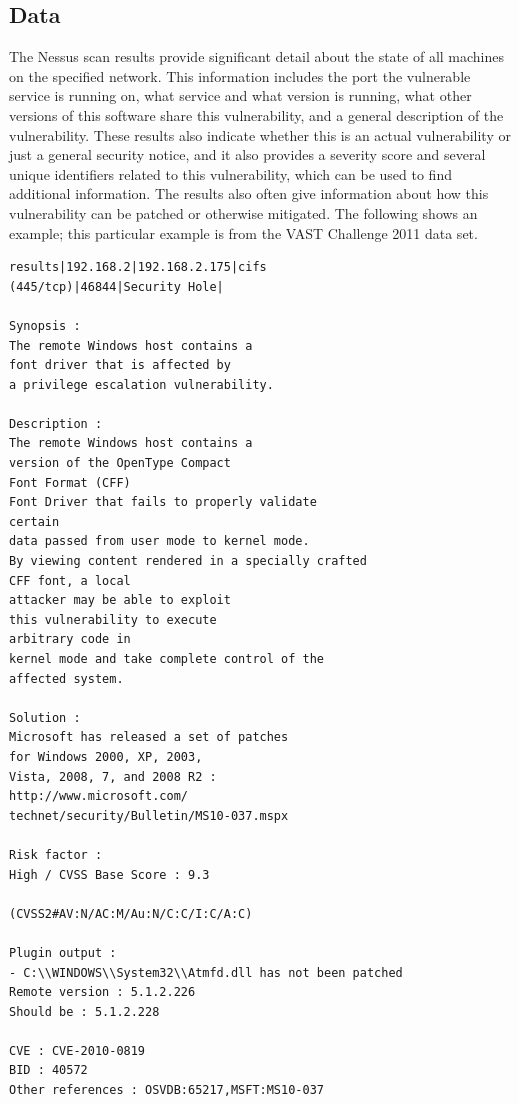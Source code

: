 \documentclass{acm_proc_article-sp}
\begin{document}
\subsection{Data}
The Nessus scan results provide significant detail about the state of all machines on the specified network.
This information includes the port the vulnerable service is running on, what service and what version is running, what other versions of this software share this vulnerability, and a general description of the vulnerability.
These results also indicate whether this is an actual vulnerability or just a general security notice, and it also provides a severity score and several unique identifiers related to this vulnerability, which can be used to find additional information.
The results also often give information about how this vulnerability can be patched or otherwise mitigated. The following shows an example; this particular example is from the VAST Challenge 2011 data set.

\begin{verbatim}
results|192.168.2|192.168.2.175|cifs 
(445/tcp)|46844|Security Hole|

Synopsis :
The remote Windows host contains a 
font driver that is affected by
a privilege escalation vulnerability.

Description :
The remote Windows host contains a 
version of the OpenType Compact
Font Format (CFF) 
Font Driver that fails to properly validate 
certain
data passed from user mode to kernel mode.
By viewing content rendered in a specially crafted 
CFF font, a local
attacker may be able to exploit 
this vulnerability to execute 
arbitrary code in 
kernel mode and take complete control of the 
affected system.

Solution :
Microsoft has released a set of patches 
for Windows 2000, XP, 2003,
Vista, 2008, 7, and 2008 R2 :
http://www.microsoft.com/
technet/security/Bulletin/MS10-037.mspx

Risk factor :
High / CVSS Base Score : 9.3

(CVSS2#AV:N/AC:M/Au:N/C:C/I:C/A:C)

Plugin output :
- C:\\WINDOWS\\System32\\Atmfd.dll has not been patched    
Remote version : 5.1.2.226    
Should be : 5.1.2.228

CVE : CVE-2010-0819
BID : 40572
Other references : OSVDB:65217,MSFT:MS10-037
\end{verbatim}
\end{document}
